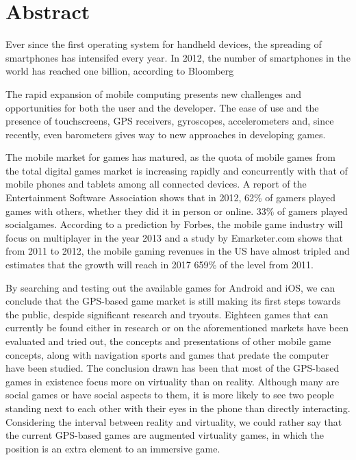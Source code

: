 \section{Abstract}

Ever since the first operating system for handheld devices, the spreading of
smartphones has intensifed every year. In 2012, the number of smartphones in the
world has reached one billion, according to Bloomberg\cite{bloomberg} \newline

The rapid expansion of mobile computing presents new challenges and
opportunities for both the user and the developer. The ease of use and the
presence of touchscreens, GPS receivers, gyroscopes, accelerometers and, since
recently, even barometers gives way to new approaches in developing
games.\newline

The mobile market for games has matured, as the quota of mobile games from the
total digital games market is increasing rapidly and concurrently with that of
mobile phones and tablets among all connected devices. A report of the
Entertainment Software Association shows that in 2012, 62\% of gamers played
games with others, whether they did it in person or online. 33\% of gamers
played socialgames\cite{esa}. According to a prediction by Forbes, the mobile
game industry will focus on multiplayer in the year 2013\cite{forbes}
and a study by Emarketer.com shows that from 2011 to 2012, the mobile
gaming revenues in the US have almost tripled and estimates that the
growth will reach in 2017 659\% of the level from 2011\cite{emarketer}.\newline

By searching and testing out the available games for Android and iOS, we can
conclude that the GPS-based game market is still making its first steps towards
the public, despide significant research and tryouts. Eighteen games that can
currently be found either in research or on the aforementioned markets have been
evaluated and tried out, the concepts and presentations of other mobile game
concepts, along with navigation sports and games that predate the computer have
been studied. The conclusion drawn has been that most of the GPS-based games in
existence focus more on virtuality than on reality. Although many are social
games or have social aspects to them, it is more likely to see two people
standing next to each other with their eyes in the phone than directly
interacting. Considering the interval between reality and virtuality, we could
rather say that the current GPS-based games are augmented virtuality games, in
which the position is an extra element to an immersive game.\newline 

